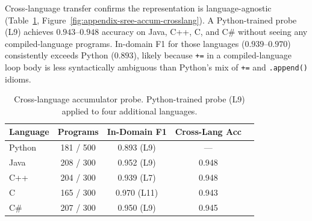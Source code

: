 Cross-language transfer confirms the representation is language-agnostic
(Table~\ref{tab:accum-crosslang}, Figure~\ref{fig:appendix-sree-accum-crosslang}).
A Python-trained probe (L9) achieves $0.943$--$0.948$ accuracy on Java, C++, C,
and C\# without seeing any compiled-language programs. In-domain F1 for those
languages ($0.939$--$0.970$) consistently exceeds Python ($0.893$), likely
because \texttt{+=} in a compiled-language loop body is less syntactically
ambiguous than Python's mix of \texttt{+=} and \texttt{.append()} idioms.

\begin{table}[t]
\centering
\caption{Cross-language accumulator probe. Python-trained probe (L9) applied
to four additional languages.}
\label{tab:accum-crosslang}
\begin{tabular}{lcccc}
\toprule
Language & Programs & In-Domain F1 & Cross-Lang Acc \\
\midrule
Python     & 181 / 500 & 0.893 (L9)  & ---   \\
Java       & 208 / 300 & 0.952 (L9)  & 0.948 \\
C++        & 204 / 300 & 0.939 (L7)  & 0.948 \\
C          & 165 / 300 & 0.970 (L11) & 0.943 \\
C\#        & 207 / 300 & 0.950 (L9)  & 0.945 \\
\bottomrule
\end{tabular}
\end{table}
